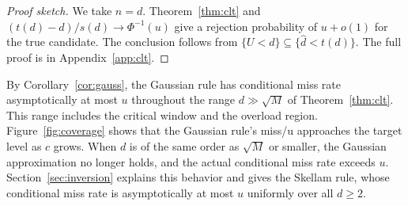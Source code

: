 \begin{proof}[Proof sketch]
We take $n=d$. Theorem~\ref{thm:clt} and $(t(d)-d)/s(d)\to\Phi^{-1}(u)$ give a rejection probability of $u+o(1)$ for the true candidate. The conclusion follows from $\{U<d\}\subseteq\{\widehat d<t(d)\}$. The full proof is in Appendix~\ref{app:clt}.
\end{proof}

By Corollary~\ref{cor:gauss}, the Gaussian rule has conditional miss rate asymptotically at most $u$ throughout the range $d\gg\sqrt M$ of Theorem~\ref{thm:clt}. This range includes the critical window and the overload region. Figure~\ref{fig:coverage} shows that the Gaussian rule's miss/u approaches the target level as $c$ grows. When $d$ is of the same order as $\sqrt M$ or smaller, the Gaussian approximation no longer holds, and the actual conditional miss rate exceeds $u$. Section~\ref{sec:inversion} explains this behavior and gives the Skellam rule, whose conditional miss rate is asymptotically at most $u$ uniformly over all $d\ge2$.
